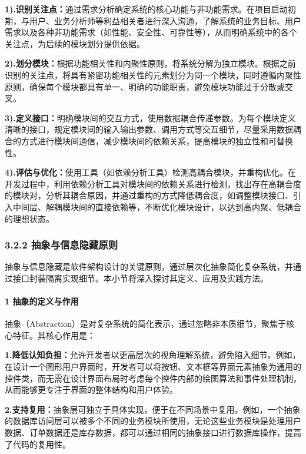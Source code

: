 \textbf{1).识别关注点：}通过需求分析确定系统的核心功能与非功能需求。在项目启动初期，与用户、业务分析师等利益相关者进行深入沟通，了解系统的业务目标、用户需求以及各种非功能需求（如性能、安全性、可靠性等），从而明确系统中的各个关注点，为后续的模块划分提供依据。

\textbf{2).划分模块：}根据功能相关性和内聚性原则，将系统分解为独立模块。根据之前识别的关注点，将具有紧密功能相关性的元素划分为同一个模块，同时遵循内聚性原则，确保每个模块都具有单一、明确的功能职责，避免模块功能过于分散或交叉。

\textbf{3).定义接口：}明确模块间的交互方式，使用数据耦合传递参数。为每个模块定义清晰的接口，规定模块间的输入输出参数、调用方式等交互细节，尽量采用数据耦合的方式进行模块间通信，减少模块间的依赖关系，提高模块的独立性和可替换性。

\textbf{4).评估与优化：}使用工具（如依赖分析工具）检测高耦合模块，并重构优化。在开发过程中，利用依赖分析工具对模块间的依赖关系进行检测，找出存在高耦合度的模块对，分析其耦合原因，并通过重构的方式降低耦合度，如调整模块接口、引入中间层、解耦模块间的直接依赖等，不断优化模块设计，以达到高内聚、低耦合的理想状态。

\subsubsection{3.2.2 抽象与信息隐藏原则}\label{ux62bdux8c61ux4e0eux4fe1ux606fux9690ux85cfux539fux5219}

抽象与信息隐藏是软件架构设计的关键原则，通过层次化抽象简化复杂系统，并通过接口封装隔离实现细节。本小节将深入探讨其定义、应用及实践方法。

\paragraph{1 抽象的定义与作用}\label{ux62bdux8c61ux7684ux5b9aux4e49ux4e0eux4f5cux7528}

抽象（Abstraction）是对复杂系统的简化表示，通过忽略非本质细节，聚焦于核心特征。其核心作用是：

\textbf{1.降低认知负担：}允许开发者以更高层次的视角理解系统，避免陷入细节。例如，在设计一个图形用户界面时，开发者可以将按钮、文本框等界面元素抽象为通用的控件类，而无需在设计界面布局时考虑每个控件内部的绘图算法和事件处理机制，从而能够更专注于界面的整体结构和用户体验。

\textbf{2.支持复用：}抽象层可独立于具体实现，便于在不同场景中复用。例如，一个抽象的数据库访问层可以被多个不同的业务模块所使用，无论这些业务模块是处理用户数据、订单数据还是库存数据，都可以通过相同的抽象接口进行数据库操作，提高了代码的复用性。

